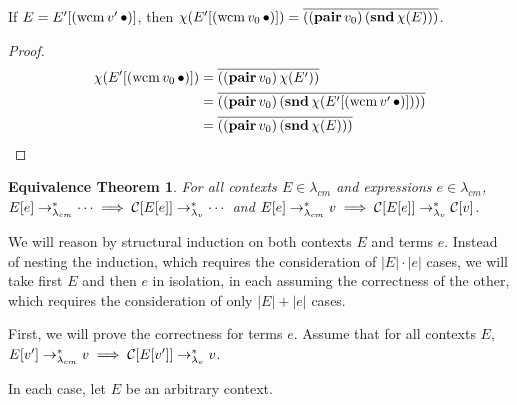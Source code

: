 \begin{lemma}
\label{wcm-collapse}
If $E=E'[(\mathrm{wcm}\,v'\,\bullet)]$, then $\chi(E'[(\mathrm{wcm}\,v_0\,\bullet)])=\overline{((\mathbf{pair}\,v_0)\,(\mathbf{snd}\,\chi(E)))}$.
\end{lemma}

\begin{proof}
\begin{align*}
\chi(E'[(\mathrm{wcm}\,v_0\,\bullet)]) &= \overline{((\mathbf{pair}\,v_0)\,\chi(E'))}\\
                           &= \overline{((\mathbf{pair}\,v_0)\,(\mathbf{snd}\,\chi(E'[(\mathrm{wcm}\,v'\,\bullet)])))}\\
                           &= \overline{((\mathbf{pair}\,v_0)\,(\mathbf{snd}\,\chi(E)))}\\
\end{align*}
\end{proof}

\newtheorem*{eqtheorem}{Equivalence Theorem}
\begin{eqtheorem}
For all contexts $E\in\lambda_{cm}$ and expressions $e\in\lambda_{cm}$, $E[e]\rightarrow_{\lambda_{cm}}^{*}\cdots\implies\mathcal{C}[E[e]]\rightarrow_{\lambda_v}^{*}\cdots$ and $E[e]\rightarrow_{\lambda_{cm}}^{*} v\implies\mathcal{C}[E[e]]\rightarrow_{\lambda_v}^{*} \mathcal{C}[v]$.
\end{eqtheorem}

We will reason by structural induction on both contexts $E$ and terms $e$. Instead of
nesting the induction, which requires the consideration of $|E|\cdot|e|$ cases, we will
take first $E$ and then $e$ in isolation, in each assuming the correctness of the other,
which requires the consideration of only $|E|+|e|$ cases.

First, we will prove the correctness for terms $e$. Assume that for all contexts $E$,
$E[v']\rightarrow_{\lambda_{cm}}^{*} v\implies\mathcal{C}[E[v']]\rightarrow_{\lambda_v}^{*} v$.

In each case, let $E$ be an arbitrary context.


